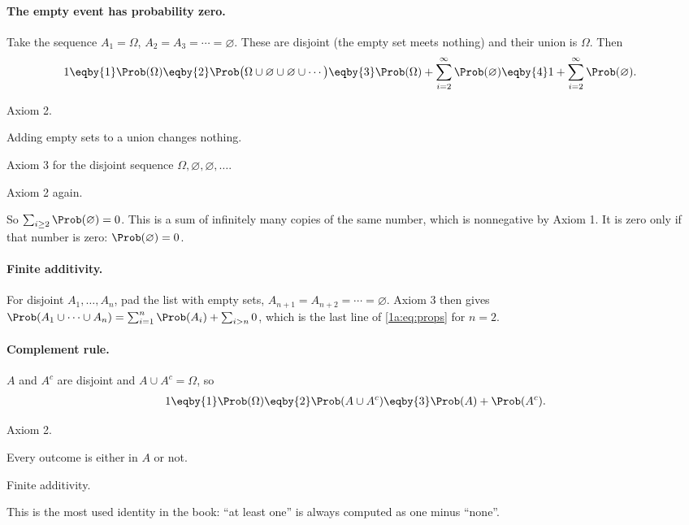 \paragraph{The empty event has probability zero.} Take the sequence
$A_1=\Omega$, $A_2=A_3=\cdots=\varnothing$. These are disjoint (the empty set
meets nothing) and their union is $\Omega$. Then
\begin{align*}
1 &\eqby{1} \Prob(\Omega)
   \eqby{2} \Prob\bigl(\Omega\cup\varnothing\cup\varnothing\cup\cdots\bigr)
   \eqby{3} \Prob(\Omega)+\sum_{i=2}^\infty\Prob(\varnothing)
   \eqby{4} 1+\sum_{i=2}^\infty\Prob(\varnothing).
\end{align*}
\begin{explain}
  \item Axiom 2.
  \item Adding empty sets to a union changes nothing.
  \item Axiom 3 for the disjoint sequence $\Omega,\varnothing,\varnothing,\dots$.
  \item Axiom 2 again.
\end{explain}
So $\sum_{i\ge2}\Prob(\varnothing)=0$. This is a sum of infinitely many copies
of the same number, which is nonnegative by Axiom 1. It is zero only if that
number is zero: $\Prob(\varnothing)=0$.

\paragraph{Finite additivity.} For disjoint $A_1,\dots,A_n$, pad the list with
empty sets, $A_{n+1}=A_{n+2}=\cdots=\varnothing$. Axiom 3 then gives
$\Prob(A_1\cup\cdots\cup A_n)=\sum_{i=1}^n\Prob(A_i)+\sum_{i>n}0$, which is the
last line of \eqref{1a:eq:props} for $n=2$.

\paragraph{Complement rule.} $A$ and $A^c$ are disjoint and $A\cup A^c=\Omega$, so
\begin{align}
1\eqby{1}\Prob(\Omega)\eqby{2}\Prob(A\cup A^c)\eqby{3}\Prob(A)+\Prob(A^c).
\label{1a:eq:complement}
\end{align}
\begin{explain}
  \item Axiom 2.
  \item Every outcome is either in $A$ or not.
  \item Finite additivity.
\end{explain}
This is the most used identity in the book: ``at least one'' is always
computed as one minus ``none''.

